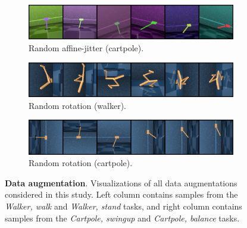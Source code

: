 \begin{figure}[H]
\begin{subfigure}[b]{0.48\textwidth}
    \end{subfigure}
    \begin{subfigure}[b]{0.48\textwidth}
        \centering
        \includegraphics[width=\textwidth]{figures/visualizations/grid_cartpole_affinejitter.png}
        \caption{Random affine-jitter (cartpole).}
        \vspace{0.1in}
    \end{subfigure}
    \begin{subfigure}[b]{0.48\textwidth}
        \centering
        \includegraphics[width=\textwidth]{figures/visualizations/grid_rotation.png}
        \caption{Random rotation (walker).}
        \vspace{0.1in}
    \end{subfigure}
    \begin{subfigure}[b]{0.48\textwidth}
        \centering
        \includegraphics[width=\textwidth]{figures/visualizations/grid_cartpole_rotation.png}
        \caption{Random rotation (cartpole).}
        \vspace{0.1in}
    \end{subfigure}
    \caption{\textbf{Data augmentation}. Visualizations of all data augmentations considered in this study. Left column contains samples from the \textit{Walker, walk} and \textit{Walker, stand} tasks, and right column contains samples from the \textit{Cartpole, swingup} and \textit{Cartpole, balance} tasks.}
    \label{fig:data-aug-visualization}
\end{figure}

